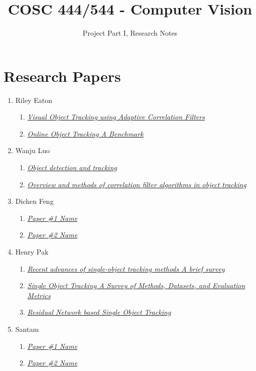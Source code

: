 \documentclass{article}
\title{COSC 444/544 - Computer Vision}
\author{Project Part I, Research Notes}
\begin{document}
\maketitle

\section*{Research Papers}

\begin{enumerate}
\item Riley Eaton
  \begin{enumerate}[label*=\arabic*.]
  \item \textit{\href{https://typeset.io/papers/visual-object-tracking-using-adaptive-correlation-filters-1xuhtpe358}{Visual Object Tracking using Adaptive Correlation Filters}}
  \item \textit{\href{https://faculty.ucmerced.edu/mhyang/papers/cvpr13_benchmark.pdf}{Online Object Tracking\: A Benchmark}}
  \end{enumerate}
\item Wanju Luo
  \begin{enumerate}[label*=\arabic*.]
  \item \textit{\href{https://www.sciencedirect.com/science/article/pii/B9780323857871000166?via%3Dihub}{Object detection and tracking}}
  \item \textit{\href{https://link.springer.com/article/10.1007/s40747-020-00161-4}{Overview and methods of correlation filter algorithms in object tracking}}
  \end{enumerate}
\item Dichen Feng
  \begin{enumerate}[label*=\arabic*.]
  \item \textit{\href{paper_link_here}{Paper \#1 Name}}
  \item \textit{\href{paper_link_here}{Paper \#2 Name}}
  \end{enumerate}
\item Henry Pak
  \begin{enumerate}[label*=\arabic*.]
  \item \textit{\href{https://www.sciencedirect.com/science/article/pii/S0925231221007220}{Recent advances of single-object tracking methods\: A brief survey}}
  \item \textit{\href{https://arxiv.org/abs/2201.13066}{Single Object Tracking\: A Survey of Methods, Datasets, and Evaluation Metrics}}
  \item \textit{\href{https://ieeexplore.ieee.org/document/9774086}{Residual Network based Single Object Tracking}}
  \end{enumerate}
\item Santam
  \begin{enumerate}[label*=\arabic*.]
  \item \textit{\href{paper_link_here}{Paper \#1 Name}}
  \item \textit{\href{paper_link_here}{Paper \#2 Name}}
  \end{enumerate}
\end{enumerate}
\end{document}
